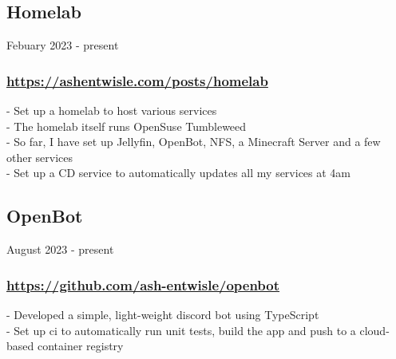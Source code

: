 \subsection{Homelab} Febuary 2023 - present \\
\subsubsection{\href{https://ashentwisle.com/posts/homelab-go-brrr}{https://ashentwisle.com/posts/homelab}}
-\:  Set up a homelab to host various services \\
-\:  The homelab itself runs OpenSuse Tumbleweed \\
-\:  So far, I have set up Jellyfin, OpenBot, NFS, a Minecraft Server and a few other services \\
-\:  Set up a CD service to automatically updates all my services at 4am \\


\subsection{OpenBot} August 2023 - present \\
\subsubsection{\href{https://github.com/ash-entwisle/openbot}{https://github.com/ash-entwisle/openbot}}
-\:  Developed a simple, light-weight discord bot using TypeScript \\
-\:  Set up ci to automatically run unit tests, build the app and push to a cloud-based container registry \\


